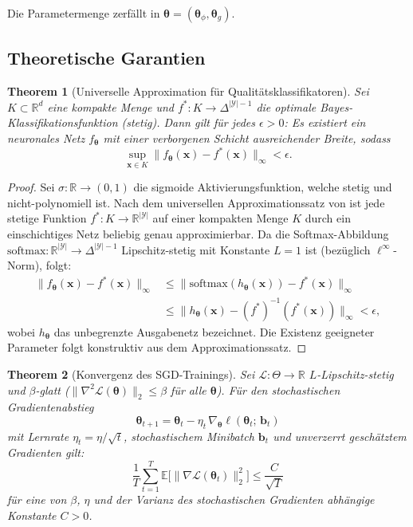\documentclass[a4paper, 12pt, twoside, openright]{report}
\newtheorem{theorem}{Theorem}[section]
\theoremstyle{definition}
\theoremstyle{definition}
\begin{document}
Die Parametermenge zerfällt in $\boldsymbol{\theta} = (\boldsymbol{\theta}_\phi, \boldsymbol{\theta}_g)$.

\subsection{Theoretische Garantien}

\begin{theorem}[Universelle Approximation für Qualitätsklassifikatoren]
	\label{thm:ua}
	Sei $K \subset \mathbb{R}^d$ eine kompakte Menge und
	$f^* : K \to \Delta^{|\mathcal{Y}|-1}$ die optimale Bayes-Klassifikationsfunktion
	(stetig). Dann gilt für jedes $\epsilon > 0$: Es existiert ein neuronales
	Netz $f_{\boldsymbol{\theta}}$ mit einer verborgenen Schicht ausreichender
	Breite, sodass
	\[
	\sup_{\mathbf{x} \in K}
	\bigl\|f_{\boldsymbol{\theta}}(\mathbf{x}) - f^*(\mathbf{x})\bigr\|_\infty
	< \epsilon.
	\]
\end{theorem}

\begin{proof}
	Sei $\sigma : \mathbb{R} \to (0,1)$ die sigmoide Aktivierungsfunktion,
	welche stetig und nicht-polynomiell ist. Nach dem universellen
	Approximationssatz von \cite{hornik1989} ist jede stetige Funktion
	$f^* : K \to \mathbb{R}^{|\mathcal{Y}|}$ auf einer kompakten Menge $K$
	durch ein einschichtiges Netz beliebig genau approximierbar. Da die
	Softmax-Abbildung $\mathrm{softmax} : \mathbb{R}^{|\mathcal{Y}|} \to
	\Delta^{|\mathcal{Y}|-1}$ Lipschitz-stetig mit Konstante $L = 1$ ist
	(bezüglich $\ell^\infty$-Norm), folgt:
	\begin{align*}
		\bigl\|f_{\boldsymbol{\theta}}(\mathbf{x}) - f^*(\mathbf{x})\bigr\|_\infty
		&\leq \bigl\|\mathrm{softmax}(h_{\boldsymbol{\theta}}(\mathbf{x}))
		- f^*(\mathbf{x})\bigr\|_\infty \\
		&\leq \bigl\|h_{\boldsymbol{\theta}}(\mathbf{x})
		- (f^*)^{-1}(f^*(\mathbf{x}))\bigr\|_\infty
		< \epsilon,
	\end{align*}
	wobei $h_{\boldsymbol{\theta}}$ das unbegrenzte Ausgabenetz bezeichnet.
	Die Existenz geeigneter Parameter folgt konstruktiv aus dem
	Approximationssatz.
\end{proof}

\begin{theorem}[Konvergenz des SGD-Trainings]
	\label{thm:sgd}
	Sei $\mathcal{L} : \Theta \to \mathbb{R}$ $L$-Lipschitz-stetig und
	$\beta$-glatt ($\|\nabla^2 \mathcal{L}(\boldsymbol{\theta})\|_2 \leq \beta$
	für alle $\boldsymbol{\theta}$). Für den stochastischen Gradientenabstieg
	\[
	\boldsymbol{\theta}_{t+1} = \boldsymbol{\theta}_t -
	\eta_t \,\nabla_{\boldsymbol{\theta}} \ell(\boldsymbol{\theta}_t;\,
	\mathbf{b}_t)
	\]
	mit Lernrate $\eta_t = \eta / \sqrt{t}$, stochastischem Minibatch
	$\mathbf{b}_t$ und unverzerrt geschätztem Gradienten gilt:
	\[
	\frac{1}{T} \sum_{t=1}^{T}
	\mathbb{E}\bigl[\bigl\|\nabla \mathcal{L}(\boldsymbol{\theta}_t)\bigr\|_2^2\bigr]
	\leq \frac{C}{\sqrt{T}}
	\]
	für eine von $\beta$, $\eta$ und der Varianz des stochastischen Gradienten
	abhängige Konstante $C > 0$.
\end{theorem}
\end{document}
